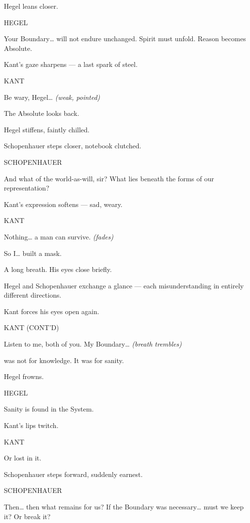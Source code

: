 \documentclass[12pt]{article}
\newenvironment{dialogue}[1]{%
  \vspace{0.8\baselineskip}%
  \noindent\hspace*{2.3in}\textsc{#1}\par%
  \noindent\hspace*{1.5in}\begin{minipage}[t]{4.5in}%
}{%
  \end{minipage}\par%
}
\newcommand{\paren}[1]{%
  \noindent\hspace*{1.8in}\textit{(#1)}\par%
}
\begin{document}
Hegel leans closer.

\begin{dialogue}{HEGEL}
Your Boundary… will not endure unchanged.
Spirit must unfold.
Reason becomes Absolute.
\end{dialogue}

Kant’s gaze sharpens — a last spark of steel.

\begin{dialogue}{KANT}
Be wary, Hegel…
\paren{weak, pointed}
The Absolute looks back.
\end{dialogue}

Hegel stiffens, faintly chilled.

Schopenhauer steps closer, notebook clutched.

\begin{dialogue}{SCHOPENHAUER}
And what of the world-as-will, sir?
What lies beneath the forms of our representation?
\end{dialogue}

Kant’s expression softens — sad, weary.

\begin{dialogue}{KANT}
Nothing… a man can survive.
\paren{fades}
So I… built a mask.
\end{dialogue}

A long breath.
His eyes close briefly.

Hegel and Schopenhauer exchange a glance —
each misunderstanding in entirely different directions.

Kant forces his eyes open again.

\begin{dialogue}{KANT (CONT'D)}
Listen to me, both of you.
My Boundary…
\paren{breath trembles}
was not for knowledge.
It was for sanity.
\end{dialogue}

Hegel frowns.

\begin{dialogue}{HEGEL}
Sanity is found in the System.
\end{dialogue}

Kant’s lips twitch.

\begin{dialogue}{KANT}
Or lost in it.
\end{dialogue}

Schopenhauer steps forward, suddenly earnest.

\begin{dialogue}{SCHOPENHAUER}
Then… then what remains for us?
If the Boundary was necessary…
must we keep it?
Or break it?
\end{dialogue}
\end{document}
